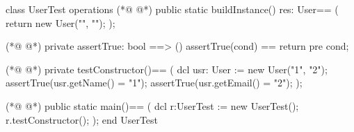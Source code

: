 \begin{vdmpp}[breaklines=true]
class UserTest
 operations
(*@
\label{buildInstance:3}
@*)
  public static buildInstance() res: User==
  (
   return new User("", "");
  );
  
(*@
\label{assertTrue:8}
@*)
  private assertTrue: bool ==> ()
    assertTrue(cond) == return
    pre cond;
    
(*@
\label{testConstructor:12}
@*)
  private testConstructor()==
  (
   dcl usr: User := new User("1", "2");
   assertTrue(usr.getName() = "1");
   assertTrue(usr.getEmail() = "2");
  );
  
(*@
\label{main:19}
@*)
  public static main()==
    (
   dcl r:UserTest := new UserTest();
   r.testConstructor();
    );
end UserTest
\end{vdmpp}
